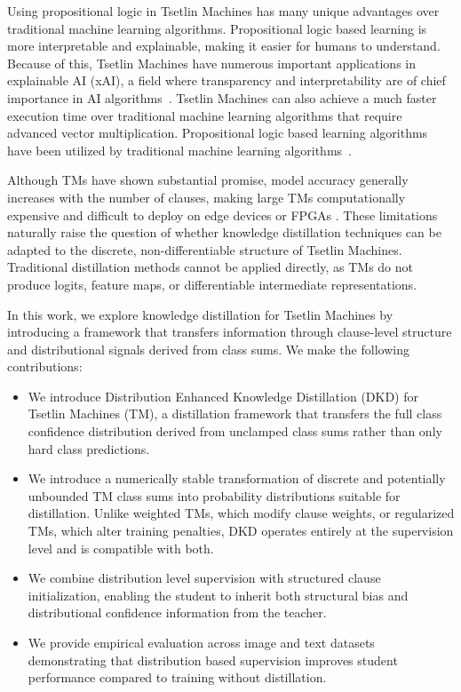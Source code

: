 \documentclass[sn-mathphys-num]{sn-jnl}%
\theoremstyle{thmstyleone}%
\theoremstyle{thmstyletwo}%
\theoremstyle{thmstylethree}%
\begin{document}
Using propositional logic in Tsetlin Machines has many unique advantages over traditional machine learning algorithms. Propositional logic based learning is more interpretable and explainable, making it easier for humans to understand. Because of this, Tsetlin Machines have numerous important applications in explainable AI (xAI), a field where transparency and interpretability are of chief importance in AI algorithms~\cite{xu2019explainable,dovsilovic2018explainable}. Tsetlin Machines can also achieve a much faster execution time over traditional machine learning algorithms that require advanced vector multiplication. Propositional logic based learning algorithms have been utilized by traditional machine learning algorithms~\cite{anjum2022localization, anjumlocalization}.

Although TMs have shown substantial promise, model accuracy generally increases with the number of clauses, making large TMs computationally expensive and difficult to deploy on edge devices or FPGAs \cite{zhang2021low}. These limitations naturally raise the question of whether knowledge distillation techniques can be adapted to the discrete, non-differentiable structure of Tsetlin Machines. Traditional distillation methods cannot be applied directly, as TMs do not produce logits, feature maps, or differentiable intermediate representations.

In this work, we explore knowledge distillation for Tsetlin Machines by introducing a framework that transfers information through clause-level structure and distributional signals derived from class sums. We make the following contributions:
\begin{itemize}
	\item We introduce Distribution Enhanced Knowledge Distillation (DKD) for Tsetlin Machines (TM), a distillation framework that transfers the full class confidence distribution derived from unclamped class sums rather than only hard class predictions.
	\item We introduce a numerically stable transformation of discrete and potentially unbounded TM class sums into probability distributions suitable for distillation. Unlike weighted TMs, which modify clause weights, or regularized TMs, which alter training penalties, DKD operates entirely at the supervision level and is compatible with both.
	\item We combine distribution level supervision with structured clause initialization, enabling the student to inherit both structural bias and distributional confidence information from the teacher.
	\item We provide empirical evaluation across image and text datasets demonstrating that distribution based supervision improves student performance compared to training without distillation.
\end{itemize}
\end{document}

